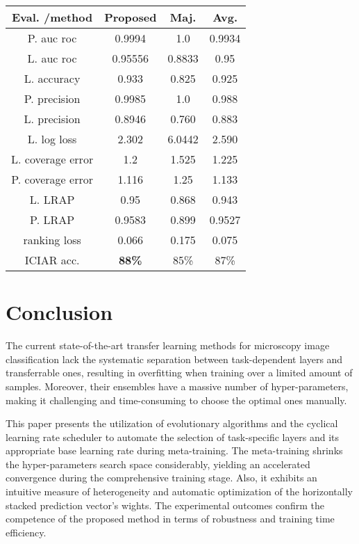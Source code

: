 \documentclass[a4paper, 12 pt, conference]{ieeeconf}
\begin{document}
\vspace{\baselineskip}


\begin{minipage}[htbp]{\columnwidth}
\centering
{} \label{tab:prpcr2}
\begin{tabular}{|c|c|c|c|} \toprule[0.5pt]
\hline
Eval. /method & Proposed & Maj. & Avg. \\
\hline
P. auc roc &  0.9994 &  1.0 & 0.9934 \\
\hline
L. auc roc&  0.95556 & 0.8833 & 0.95  \\
\hline
L. accuracy & 0.933 & 0.825 & 0.925 \\
\hline
P. precision & 0.9985 & 1.0 & 0.988 \\
\hline
L. precision & 0.8946 & 0.760 & 0.883 \\
\hline
L. log loss& 2.302 & 6.0442 & 2.590 \\
\hline
L. coverage error & 1.2 & 1.525 & 1.225 \\
\hline
P. coverage error & 1.116 & 1.25   & 1.133 \\
\hline
L. LRAP & 0.95 & 0.868 & 0.943 \\
\hline
P. LRAP & 0.9583 & 0.899 & 0.9527 \\
\hline
ranking loss & 0.066 & 0.175 & 0.075 \\
\hline
ICIAR acc. & \textbf{88\%} & 85\% & 87\% \\
\hline

\bottomrule[0.5pt]
\end{tabular}
\end{minipage}




\section{Conclusion}
	\quad The current state-of-the-art transfer learning methods for microscopy image classification lack the systematic separation between task-dependent layers and transferrable ones, resulting in overfitting when training over a limited amount of samples. Moreover, their ensembles have a massive number of hyper-parameters, making it challenging and time-consuming to choose the optimal ones manually.

	\quad This paper presents the utilization of evolutionary algorithms and the cyclical learning rate scheduler to automate the selection of task-specific layers and its appropriate base learning rate during meta-training. The meta-training shrinks the hyper-parameters search space considerably, yielding an accelerated convergence during the comprehensive training stage. Also, it exhibits an intuitive measure of heterogeneity and automatic optimization of the horizontally stacked prediction vector's wights. The experimental outcomes confirm the competence of the proposed method in terms of robustness and training time efficiency.
\end{document}
